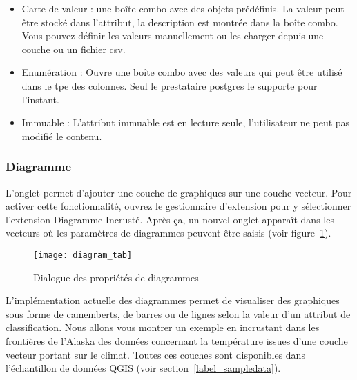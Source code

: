 \begin{itemize}
\begin{itemize}
\item Carte de valeur : une boîte combo avec des objets prédéfinis. La valeur peut être stocké dans l'attribut, la description est montrée dans la boîte combo. Vous pouvez définir les valeurs manuellement ou les charger depuis une couche ou un fichier csv.
\item Enumération : Ouvre une boîte combo avec des valeurs qui peut être utilisé dans le tpe des colonnes. Seul le prestataire postgres le supporte pour l'instant.
\item Immuable : L'attribut immuable est en lecture seule, l'utilisateur ne peut pas modifié le contenu.
\end{itemize}

\subsubsection{Diagramme}\label{sec:diagram}
L'onglet  permet d'ajouter une couche de graphiques sur une couche vecteur. Pour activer cette fonctionnalité, ouvrez le gestionnaire d'extension pour y sélectionner l'extension Diagramme Incrusté. Après ça, un nouvel onglet apparaît dans les  vecteurs où les paramètres de diagrammes peuvent être saisis (voir figure~\ref{fig:diagramtab}).

\begin{figure}[ht]
   \begin{center}
   \caption{Dialogue des propriétés de diagrammes \nixcaption}\label{fig:diagramtab}\smallskip
   \texttt{[image: diagram\_tab]}
\end{center}
\end{figure}

L'implémentation actuelle des diagrammes permet de visualiser des graphiques sous forme de camemberts, de barres ou de lignes selon la valeur d'un attribut de classification. Nous allons vous montrer un exemple en incrustant dans les frontières de l'Alaska des données concernant la température issues d'une couche vecteur portant sur le climat. Toutes ces couches sont disponibles dans l'échantillon de données QGIS (voir section~\ref{label_sampledata}).


\end{itemize}
